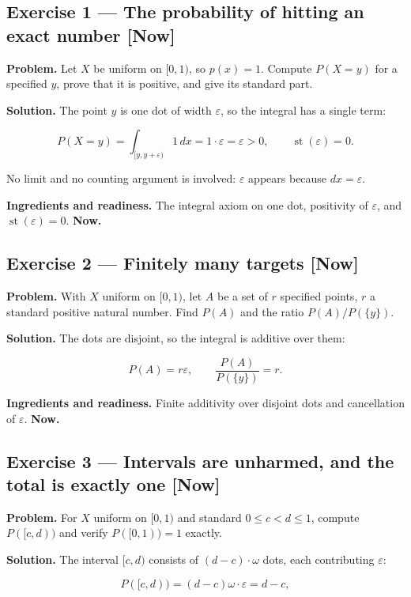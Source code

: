 \documentclass[11pt]{article}
\newcommand{\eps}{\varepsilon}
\renewcommand{\epsilon}{\varepsilon}
\newcommand{\st}{\operatorname{st}}
\begin{document}
\subsection*{Exercise 1 --- The probability of hitting an exact number \hfill \normalfont\small[Now]}

\textbf{Problem.} Let $X$ be uniform on $[0,1)$, so $p(x) = 1$. Compute $P(X = y)$
for a specified $y$, prove that it is positive, and give its standard part.

\textbf{Solution.} The point $y$ is one dot of width $\eps$, so the integral has
a single term:

\[
P(X=y)=\int_{[y,y+\epsilon)} 1\,dx=1\cdot\epsilon=\epsilon>0,
\qquad \operatorname{st}(\epsilon)=0 .
\]

No limit and no counting argument is involved: $\eps$ appears because
$dx = \eps$.

\textbf{Ingredients and readiness.} The integral axiom on one dot, positivity of
$\eps$, and $\st(\eps) = 0$. \textbf{Now.}


\subsection*{Exercise 2 --- Finitely many targets \hfill \normalfont\small[Now]}

\textbf{Problem.} With $X$ uniform on $[0,1)$, let $A$ be a set of $r$ specified
points, $r$ a standard positive natural number. Find $P(A)$ and the ratio
$P(A)/P(\{y\})$.

\textbf{Solution.} The dots are disjoint, so the integral is additive over them:

\[
P(A)=r\epsilon,\qquad \frac{P(A)}{P(\{y\})}=r .
\]

\textbf{Ingredients and readiness.} Finite additivity over disjoint dots and
cancellation of $\eps$. \textbf{Now.}


\subsection*{Exercise 3 --- Intervals are unharmed, and the total is exactly one \hfill \normalfont\small[Now]}

\textbf{Problem.} For $X$ uniform on $[0,1)$ and standard $0 \le  c < d \le  1$,
compute $P([c,d))$ and verify $P([0,1)) = 1$ exactly.

\textbf{Solution.} The interval $[c,d)$ consists of $(d-c)\cdot \omega$ dots, each
contributing $\eps$:

\[
P([c,d))=(d-c)\omega\cdot\epsilon=d-c ,
\]
\end{document}
